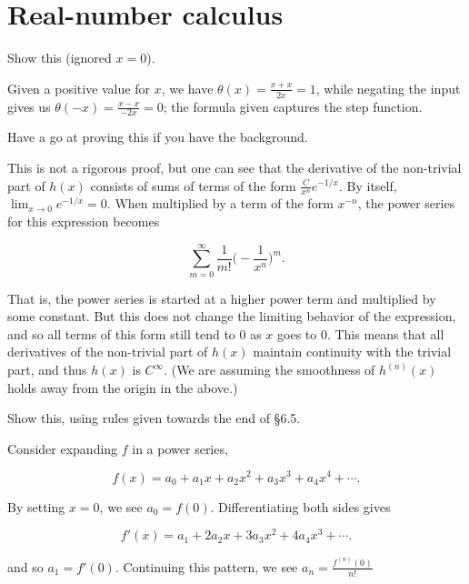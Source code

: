 \documentclass[../the-road-to-reality.tex]{subfiles}
\begin{document}
	
\section{Real-number calculus}

\begin{questions}

\question Show this (ignored $x = 0$).

\begin{solution}
	Given a positive value for $x$, we have $\theta(x) = \frac{x + x}{2x} = 1$, while negating the input gives us $\theta(-x) = \frac{x - x}{-2x} = 0$; the formula given captures the step function.
\end{solution}

\question Have a go at proving this if you have the background.

\begin{solution}
	This is not a rigorous proof, but one can see that the derivative of the non-trivial part of $h(x)$ consists of sums of terms of the form $\frac{C}{x^n}e^{-1/x}$. By itself, $\lim_{x\to0}e^{-1/x}=0$. When multiplied by a term of the form $x^{-n}$, the power series for this expression becomes

	\[
	\sum_{m=0}^{\infty}\frac{1}{m!}\Big(-\frac{1}{x^n}\Big)^m
	.\] 

	That is, the power series is started at a higher power term and multiplied by some constant. But this does not change the limiting behavior of the expression, and so all terms of this form still tend to $0$ as $x$ goes to $0$. This means that all derivatives of the non-trivial part of $h(x)$ maintain continuity with the trivial part, and thus $h(x)$ is $C^{\infty}$. (We are assuming the smoothness of $h^{(n)}(x)$ holds away from the origin in the above.)
\end{solution}

\question Show this, using rules given towards the end of \S6.5.

\begin{solution}
	Consider expanding $f$ in a power series,
	
	\[
		f(x) = a_0 + a_1x + a_2x^2 + a_3x^3 + a_4x^4 + \cdots
	.\] 	

	By setting $x = 0$, we see $a_0 = f(0)$. Differentiating both sides gives
	
	\[
		f'(x) = a_1 + 2a_2x + 3a_3x^2 + 4a_4x^3 + \cdots
	.\] 	

	and so $a_1 = f'(0)$. Continuing this pattern, we see $a_n = \frac{f^{(n)}(0)}{n!}$
\end{solution}


\end{questions}
\end{document}

